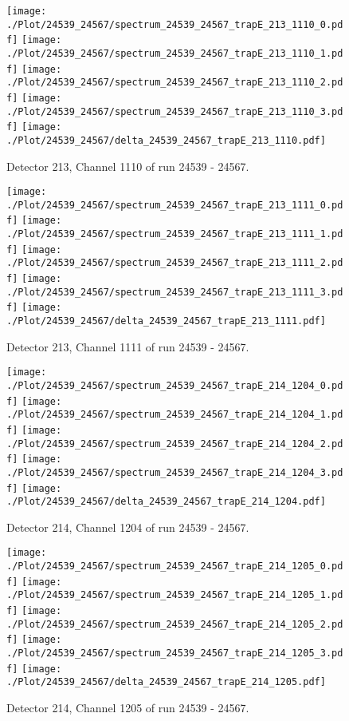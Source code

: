 \clearpage
\begin{figure}[hb]
\centering
\texttt{[image: ./Plot/24539\_24567/spectrum\_24539\_24567\_trapE\_213\_1110\_0.pdf]}
\texttt{[image: ./Plot/24539\_24567/spectrum\_24539\_24567\_trapE\_213\_1110\_1.pdf]}
\texttt{[image: ./Plot/24539\_24567/spectrum\_24539\_24567\_trapE\_213\_1110\_2.pdf]}
\texttt{[image: ./Plot/24539\_24567/spectrum\_24539\_24567\_trapE\_213\_1110\_3.pdf]}
\texttt{[image: ./Plot/24539\_24567/delta\_24539\_24567\_trapE\_213\_1110.pdf]}
\caption{ Detector 213, Channel 1110 of run 24539 - 24567.}
\label{fig:24539_24567_trapE_213_1110}
\end{figure}
\clearpage
\begin{figure}[hb]
\centering
\texttt{[image: ./Plot/24539\_24567/spectrum\_24539\_24567\_trapE\_213\_1111\_0.pdf]}
\texttt{[image: ./Plot/24539\_24567/spectrum\_24539\_24567\_trapE\_213\_1111\_1.pdf]}
\texttt{[image: ./Plot/24539\_24567/spectrum\_24539\_24567\_trapE\_213\_1111\_2.pdf]}
\texttt{[image: ./Plot/24539\_24567/spectrum\_24539\_24567\_trapE\_213\_1111\_3.pdf]}
\texttt{[image: ./Plot/24539\_24567/delta\_24539\_24567\_trapE\_213\_1111.pdf]}
\caption{ Detector 213, Channel 1111 of run 24539 - 24567.}
\label{fig:24539_24567_trapE_213_1111}
\end{figure}
\clearpage
\begin{figure}[hb]
\centering
\texttt{[image: ./Plot/24539\_24567/spectrum\_24539\_24567\_trapE\_214\_1204\_0.pdf]}
\texttt{[image: ./Plot/24539\_24567/spectrum\_24539\_24567\_trapE\_214\_1204\_1.pdf]}
\texttt{[image: ./Plot/24539\_24567/spectrum\_24539\_24567\_trapE\_214\_1204\_2.pdf]}
\texttt{[image: ./Plot/24539\_24567/spectrum\_24539\_24567\_trapE\_214\_1204\_3.pdf]}
\texttt{[image: ./Plot/24539\_24567/delta\_24539\_24567\_trapE\_214\_1204.pdf]}
\caption{ Detector 214, Channel 1204 of run 24539 - 24567.}
\label{fig:24539_24567_trapE_214_1204}
\end{figure}
\clearpage
\begin{figure}[hb]
\centering
\texttt{[image: ./Plot/24539\_24567/spectrum\_24539\_24567\_trapE\_214\_1205\_0.pdf]}
\texttt{[image: ./Plot/24539\_24567/spectrum\_24539\_24567\_trapE\_214\_1205\_1.pdf]}
\texttt{[image: ./Plot/24539\_24567/spectrum\_24539\_24567\_trapE\_214\_1205\_2.pdf]}
\texttt{[image: ./Plot/24539\_24567/spectrum\_24539\_24567\_trapE\_214\_1205\_3.pdf]}
\texttt{[image: ./Plot/24539\_24567/delta\_24539\_24567\_trapE\_214\_1205.pdf]}
\caption{ Detector 214, Channel 1205 of run 24539 - 24567.}
\label{fig:24539_24567_trapE_214_1205}
\end{figure}
